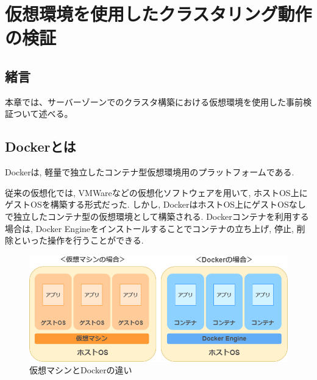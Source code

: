 \chapter{仮想環境を使用したクラスタリング動作の検証}
\label{chap:fourth}

\section{緒言}
本章では、サーバーゾーンでのクラスタ構築における仮想環境を使用した事前検証ついて述べる。





\section{Dockerとは}
Dockerは, 軽量で独立したコンテナ型仮想環境用のプラットフォームである.

従来の仮想化では, VMWareなどの仮想化ソフトウェアを用いて, ホストOS上にゲストOSを構築する形式だった.
しかし, DockerはホストOS上にゲストOSなしで独立したコンテナ型の仮想環境として構築される.
Dockerコンテナを利用する場合は, Docker Engineをインストールすることでコンテナの立ち上げ, 停止, 削除といった操作を行うことができる.

\begin{figure}
  \begin{center}
    \includegraphics[width=120mm]{sotu/figure/docker-vmware.png}
    \caption{仮想マシンとDockerの違い \cite{3}}
    \label{4-p1}
  \end{center}
\end{figure}


